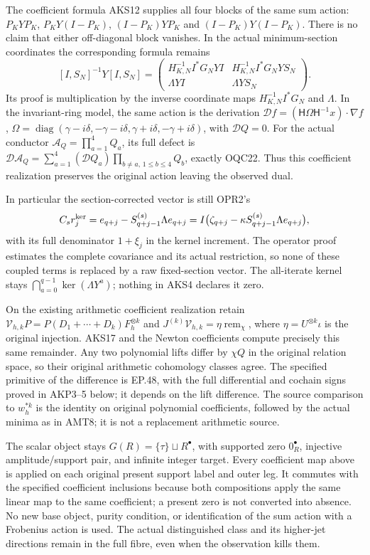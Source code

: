 \documentclass[11pt,a4paper]{article}
\begin{document}
The coefficient formula AKS12 supplies all four blocks of the same sum
action: $P_KYP_K$, $P_KY(I-P_K)$, $(I-P_K)YP_K$ and
$(I-P_K)Y(I-P_K)$. There is no claim that either off-diagonal block
vanishes. In the actual minimum-section coordinates the corresponding
formula remains
\[
 [I,S_N]^{-1}Y[I,S_N]=
 \begin{pmatrix}
 H_{K,N}^{-1}I^*G_NYI&H_{K,N}^{-1}I^*G_NYS_N\\
 \Lambda YI&\Lambda YS_N
 \end{pmatrix}.
 \tag{AKS49}
\]
Its proof is multiplication by the inverse coordinate maps
$H_{K,N}^{-1}I^*G_N$ and $\Lambda$. In the invariant-ring model, the same
action is the derivation
$\mathcal Df=(\mathsf H\Omega\mathsf H^{-1}x)\cdot\nabla f$,
$\Omega=\operatorname{diag}(\gamma-i\delta,-\gamma-i\delta,
\gamma+i\delta,-\gamma+i\delta)$, with $\mathcal DQ=0$.
For the actual conductor $\mathcal A_Q=\prod_{a=1}^4Q_a$, its full defect
is $\mathcal D\mathcal A_Q=\sum_{a=1}^4(\mathcal DQ_a)
\prod_{b\ne a,\,1\le b\le4}Q_b$, exactly OQC22. Thus this coefficient
realization preserves the original action leaving the observed dual.

In particular the section-corrected vector is still OPR2's
\[
 C_s r_j^{\rm ker}=e_{q+j}-S_{q+j-1}^{(s)}\Lambda e_{q+j}
   =I\bigl(\zeta_{q+j}-\kappa S_{q+j-1}^{(s)}\Lambda e_{q+j}\bigr),
\]
with its full denominator $1+\xi_j$ in the kernel increment. The operator
proof estimates the complete covariance and its actual restriction, so
none of these coupled terms is replaced by a raw fixed-section vector.
The all-iterate kernel stays
$\bigcap_{a=0}^{q-1}\ker(\Lambda Y^a)$; nothing in AKS4 declares it zero.

On the existing arithmetic coefficient realization retain
$\mathcal V_{h,k}P=P(D_1+\cdots+D_k)F_h^{\otimes k}$ and
$J^{(k)}\mathcal V_{h,k}=\eta\operatorname{rem}_\chi$, where
$\eta=U^{\otimes k}\iota$ is the original injection. AKS17 and the
Newton coefficients compute precisely this same remainder. Any two
polynomial lifts differ by $\chi Q$ in the original relation space,
so their original arithmetic cohomology classes agree. The specified
primitive of the difference is EP.48, with the full differential and
cochain signs proved in AKP3--5 below; it depends on the lift difference.
The source comparison to $w_h^{*k}$ is the identity on original
polynomial coefficients, followed by the actual minima as in AMT8;
it is not a replacement arithmetic source.

The scalar object stays $G(R)=\{\tau\}\sqcup R^\bullet$, with supported
zero $0_R^\bullet$, injective amplitude/support pair, and infinite
integer target. Every coefficient map above is applied on each original
present support label and outer leg. It commutes with the specified
coefficient inclusions because both compositions apply the same linear
map to the same coefficient; a present zero is not converted into
absence. No new base object, purity condition, or identification of the
sum action with a Frobenius action is used. The actual distinguished
class and its higher-jet directions remain in the full fibre, even
when the observation kills them.
\end{document}

